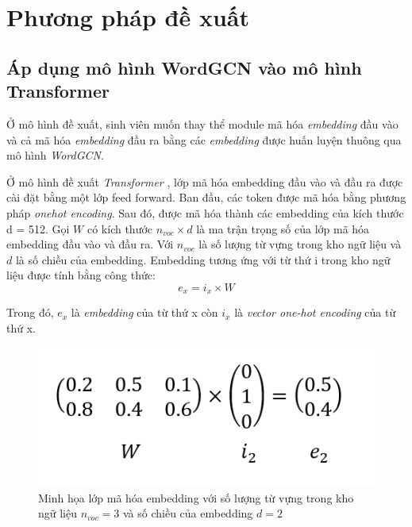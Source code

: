 \chapter{Phương pháp đề xuất}

\section{Áp dụng mô hình WordGCN vào mô hình Transformer}

Ở mô hình đề xuất, sinh viên muốn thay thể module mã hóa \textit{embedding} đầu vào và cả mã hóa \textit{embedding} đầu ra bằng các \textit{embedding} được huấn luyện thuông qua mô hình \textit{WordGCN}.

Ở mô hình đề xuất \textit{Transformer} \cite{transformer}, lớp mã hóa embedding đầu vào và đầu ra được cài đặt bằng một lớp feed forward. Ban đầu, các token được mã hóa bằng phương pháp \textit{onehot encoding}. Sau đó, được mã hóa thành các embedding của kích thước d = 512. 
Gọi $W$ có kích thước $n_{voc} \times d$ là ma trận trọng số của lớp mã hóa embedding đầu vào và đầu ra. Với $n_{voc}$ là số lượng từ vựng trong kho ngữ liệu và $d$ là số chiều của embedding. Embedding tương ứng với từ thứ i trong kho ngữ liệu được tính bằng công thức:
\begin{equation*}
	e_x = i_x \times W
\end{equation*}

Trong đó, $e_x$ là \textit{embedding} của từ thứ x còn $i_x$ là \textit{vector one-hot encoding} của từ thứ x.

\begin{figure}[H]
    \begin{center}
        \includegraphics[scale=0.8]{images/original_input_embedding}
        \caption{Minh họa lớp mã hóa embedding với số lượng từ vựng trong kho ngữ liệu $n_{voc} = 3$ và số chiều của embedding $d = 2$}
        \label{fig:original-input-embedding}
    \end{center}
\end{figure}

